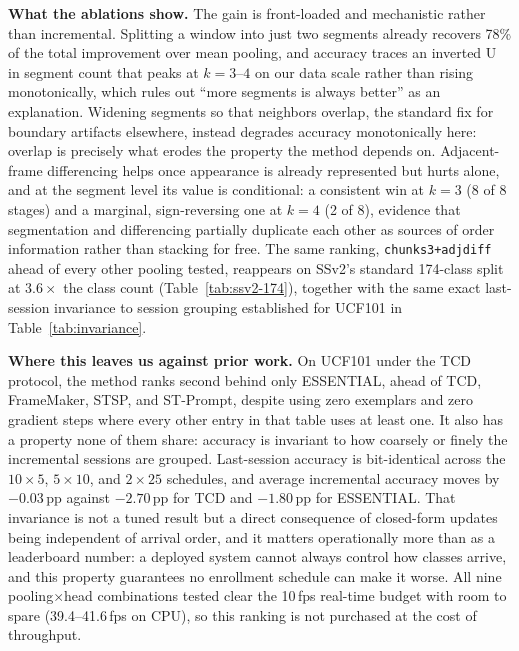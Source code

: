 \documentclass[11pt]{article}
\begin{document}
\textbf{What the ablations show.} The gain is front-loaded and mechanistic
rather than incremental. Splitting a window into just two segments already
recovers 78\% of the total improvement over mean pooling, and accuracy
traces an inverted U in segment count that peaks at $k{=}3$--$4$ on our
data scale rather than rising monotonically, which rules out ``more
segments is always better'' as an explanation. Widening segments so that
neighbors overlap, the standard fix for boundary artifacts elsewhere,
instead degrades accuracy monotonically here: overlap is precisely what
erodes the property the method depends on. Adjacent-frame differencing
helps once appearance is already represented but hurts alone, and at the
segment level its value is conditional: a consistent win at $k{=}3$ (8 of 8
stages) and a marginal, sign-reversing one at $k{=}4$ (2 of 8), evidence
that segmentation and differencing partially duplicate each other as
sources of order information rather than stacking for free. The same
ranking, \texttt{chunks3+adjdiff} ahead of every other pooling tested,
reappears on SSv2's standard 174-class split at $3.6\times$ the class
count (Table~\ref{tab:ssv2-174}), together with the same exact
last-session invariance to session grouping established for UCF101 in
Table~\ref{tab:invariance}.

\textbf{Where this leaves us against prior work.} On UCF101 under the TCD
protocol, the method ranks second behind only ESSENTIAL, ahead of TCD,
FrameMaker, STSP, and ST-Prompt, despite using zero exemplars and zero
gradient steps where every other entry in that table uses at least one. It
also has a property none of them share: accuracy is invariant to how
coarsely or finely the incremental sessions are grouped. Last-session
accuracy is bit-identical across the $10\times5$, $5\times10$, and
$2\times25$ schedules, and average incremental accuracy moves by
$-0.03$\,pp against $-2.70$\,pp for TCD and $-1.80$\,pp for ESSENTIAL. That invariance is not a
tuned result but a direct consequence of closed-form updates being
independent of arrival order, and it matters operationally more than as a
leaderboard number: a deployed system cannot always control how classes
arrive, and this property guarantees no enrollment schedule can make it
worse. All nine pooling$\times$head combinations tested clear the 10\,fps
real-time budget with room to spare (39.4--41.6\,fps on CPU), so this
ranking is not purchased at the cost of throughput.
\end{document}
